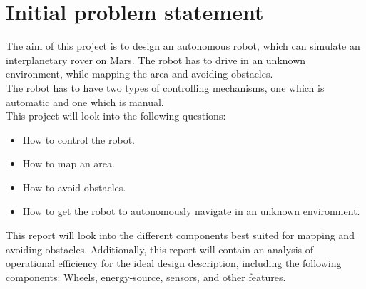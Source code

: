 \chapter{Initial problem statement}

The aim of this project is to design an autonomous robot, which can simulate an interplanetary rover on Mars. The robot has to drive in an unknown environment, while mapping the area and avoiding obstacles.\\
The robot has to have two types of controlling mechanisms, one which is automatic and one which is manual.\\
This project will look into the following questions:

\begin{itemize}
\item How to control the robot.
\item How to map an area.
\item How to avoid obstacles.
\item How to get the robot to autonomously navigate in an unknown environment.
\end{itemize}

This report will look into the different components best suited for mapping and avoiding obstacles. Additionally, this report will contain an analysis of operational efficiency for the ideal design description, including the following components: Wheels, energy-source, sensors, and other features. 









